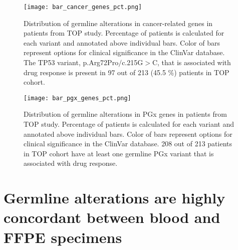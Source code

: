 
\begin{landscape}

\begin{figure}[H]
\centering
	\texttt{[image: bar\_cancer\_genes\_pct.png]}
	\caption{Distribution of germline alterations in cancer-related genes in patients from TOP study. Percentage of patients is calculated for each variant and annotated above individual bars. Color of bars represent options for clinical significance in the ClinVar database. The TP53 variant, p.Arg72Pro$/$c.215G$>$C, that is associated with drug response is present in 97 out of 213 (45.5 \%) patients in TOP cohort.}
	\label{fig:bar_cancer_genes}
\end{figure}

\end{landscape}


\begin{landscape}

\begin{figure}[H]
\centering
	\texttt{[image: bar\_pgx\_genes\_pct.png]}
	\caption{Distribution of germline alterations in PGx genes in patients from TOP study. Percentage of patients is calculated for each variant and annotated above individual bars. Color of bars represent options for clinical significance in the ClinVar database. 208 out of 213 patients in TOP cohort have at least one germline PGx variant that is associated with drug response.}
	\label{fig:bar_pgx_genes}
\end{figure}

\end{landscape}

\section{Germline alterations are highly concordant between blood and FFPE specimens}
\label{sec:GermlinealterationsarehighlyconcordantbetweenbloodandFFPEspecimens}


